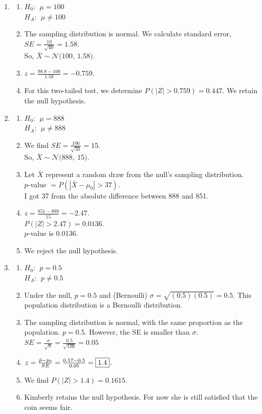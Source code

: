 \documentclass[12pt,letterpaper]{article}
\newcommand{\N}[2]{\mathcal{N}\big(#1,~#2\big)}
\begin{document}
\begin{multicols}{2}
\begin{enumerate}
\item \begin{enumerate}
\item $H_0: ~~\mu=100$\\
$H_A: ~~\mu \ne 100$
\item The sampling distribution is normal. We calculate standard error,\\ $SE = \frac{10}{\sqrt{40}} = 1.58$. \\So, $\bar{X}\sim \N{100}{1.58}$.
\item $z = \frac{98.8-100}{1.58} = -0.759$. 
\item For this two-tailed test, we determine $P(|Z| > 0.759) = 0.447$. We retain the null hypothesis.
\end{enumerate}

\columnbreak

\item \begin{enumerate}
\item $H_0: ~~\mu=888$\\
$H_A: ~~\mu \ne 888$
\item We find $SE=\frac{106}{\sqrt{50}} = 15$.\\ So, $\bar{X}\sim\N{888}{15}$.
\item Let $\bar{X}$ represent a random draw from the null's sampling distribution.  \\$p$-value $= P(|\bar{X}-\mu_0| > 37)$. \\I got 37 from the absolute difference between 888 and 851.
\item $z=\frac{851-888}{15}=-2.47$. \\$P(|Z|>2.47) = 0.0136$.\\
$p$-value is 0.0136.
\item We reject the null hypothesis. 
\end{enumerate}

\item \begin{enumerate}
\item $H_0: ~~p=0.5$\\
$H_A: ~~p\ne 0.5 $
\item Under the null, $p=0.5$ and (Bernoulli) $\sigma = \sqrt{(0.5)(0.5)} = 0.5$. This population distribution is a Bernoulli distribution.
\item The sampling distribution is normal, with the same proportion as the population. $p=0.5$. However, the SE is smaller than $\sigma$. \\
$SE = \frac{\sigma}{\sqrt{n}} = \frac{0.5}{\sqrt{100}} = 0.05$
\item $z = \frac{\hat{p}-p_0}{SE} = \frac{0.57-0.5}{0.05} = \fbox{1.4}$.
\item We find $P(|Z|>1.4) = 0.1615$.
\item Kimberly retains the null hypothesis. For now she is still satisfied that the coin seems fair.
\end{enumerate}

\end{enumerate}
\end{multicols}
\end{document}
